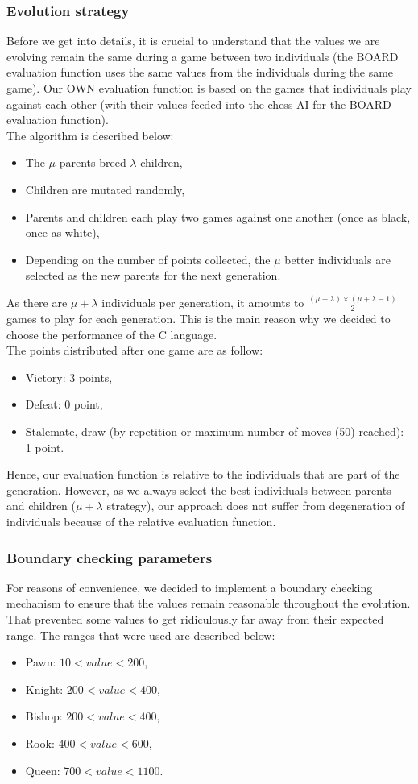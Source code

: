 \documentclass[12pt,a4paper,twocolumn]{article}
\begin{document}
\subsubsection{Evolution strategy}
Before we get into details, it is crucial to understand that the values we are evolving remain the same during a game between two individuals (the BOARD evaluation function uses the same values from the individuals during the same game). Our OWN evaluation function is based on the games that individuals play against each other (with their values feeded into the chess AI for the BOARD evaluation function).\\
The algorithm is described below:
\begin{itemize}
\item The $\mu$ parents breed $\lambda$ children,
\item Children are mutated randomly,
\item Parents and children each play two games against one another (once as black, once as white),
\item Depending on the number of points collected, the $\mu$ better individuals are selected as the new parents for the next generation.
\end{itemize}
As there are $\mu + \lambda$ individuals per generation, it amounts to $\frac{(\mu + \lambda)\times (\mu + \lambda - 1)}{2}$ games to play for each generation. This is the main reason why we decided to choose the performance of the C language.\\
The points distributed after one game are as follow:
\begin{itemize}
\item Victory: 3 points,
\item Defeat: 0 point,
\item Stalemate, draw (by repetition or maximum number of moves (50) reached): 1 point.
\end{itemize}
Hence, our evaluation function is relative to the individuals that are part of the generation. However, as we always select the best individuals between parents and children ($\mu + \lambda$ strategy), our approach does not suffer from degeneration of individuals because of the relative evaluation function.

\subsubsection{Boundary checking parameters}
For reasons of convenience, we decided to implement a boundary checking mechanism to ensure that the values remain reasonable throughout the evolution. That prevented some values to get ridiculously far away from their expected range. The ranges that were used are described below:
\begin{itemize}
\item Pawn: $10 < value < 200$,
\item Knight: $200 < value < 400$,
\item Bishop: $200 < value < 400$,
\item Rook: $400 < value < 600$,
\item Queen: $700 < value < 1100$.
\end{itemize}
\end{document}
